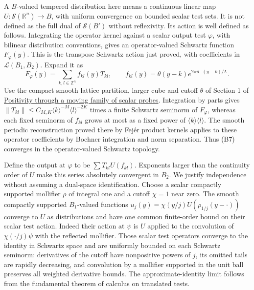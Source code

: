 \documentclass[
  11pt,
]{article}
\begin{document}
A \(B\)-valued tempered distribution here means a continuous linear map
\(U:\mathcal S(\mathbb R^n)\to B\), with uniform convergence on bounded
scalar test sets. It is not defined as the full dual of
\(\mathcal S(B')\) without reflexivity. Its action is well defined as
follows. Integrating the operator kernel against a scalar output test
\(\varphi\), with bilinear distribution conventions, gives an
operator-valued Schwartz function \(F_\varphi(y)\). This is the
transpose Schwartz action just proved, with coefficients in
\(\mathcal L(B_1,B_2)\). Expand it as \[
 F_\varphi(y)=\sum_{k,l\in\mathbb Z^n} f_{kl}(y)T_{kl},
 \qquad f_{kl}(y)=\theta(y-k)e^{2\pi i l\cdot(y-k)/L}.
 \tag{B7}
\] Use the compact smooth lattice partition, larger cube and cutoff
\(\theta\) of Section 1 of \href{positive-quantization.pdf}{Positivity
through a moving family of scalar probes}. Integration by parts gives
\(\|T_{kl}\|\le C_{M,K}\langle k\rangle^{-M}\langle l\rangle^{-2K}\)
times a finite Schwartz seminorm of \(F_\varphi\), whereas each fixed
seminorm of \(f_{kl}\) grows at most as a fixed power of
\(\langle k\rangle\langle l\rangle\). The smooth periodic reconstruction
proved there by Fejér product kernels applies to these operator
coefficients by Bochner integration and norm separation. Thus (B7)
converges in the operator-valued Schwartz topology.

Define the output at \(\varphi\) to be \(\sum T_{kl}U(f_{kl})\).
Exponents larger than the continuity order of \(U\) make this series
absolutely convergent in \(B_2\). We justify independence without
assuming a dual-space identification. Choose a scalar compactly
supported mollifier \(\rho\) of integral one and a cutoff \(\chi=1\)
near zero. The smooth compactly supported \(B_1\)-valued functions
\(u_j(y)=\chi(y/j)U(\rho_{1/j}(y-\cdot))\) converge to \(U\) as
distributions and have one common finite-order bound on their scalar
test action. Indeed their action at \(\psi\) is \(U\) applied to the
convolution of \(\chi(\cdot/j)\psi\) with the reflected mollifier. Those
scalar test operators converge to the identity in Schwartz space and are
uniformly bounded on each Schwartz seminorm: derivatives of the cutoff
have nonpositive powers of \(j\), its omitted tails are rapidly
decreasing, and convolution by a mollifier supported in the unit ball
preserves all weighted derivative bounds. The approximate-identity limit
follows from the fundamental theorem of calculus on translated tests.
\end{document}
